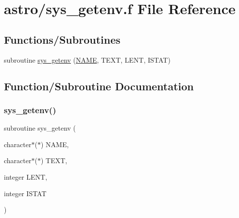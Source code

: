 \hypertarget{astro_2sys__getenv_8f}{}\section{astro/sys\+\_\+getenv.f File Reference}
\label{astro_2sys__getenv_8f}
\subsection*{Functions/\+Subroutines}
\begin{DoxyCompactItemize}
\item 
subroutine \hyperlink{astro_2sys__getenv_8f_aca2c6679545619d1cedc82daed32a87a}{sys\+\_\+getenv} (\hyperlink{inflate_8h_a164ea0159d5f0b5f12a646f25f99eceaa67bc2ced260a8e43805d2480a785d312}{N\+A\+ME}, T\+E\+XT, L\+E\+NT, I\+S\+T\+AT)
\end{DoxyCompactItemize}


\subsection{Function/\+Subroutine Documentation}
\mbox{\label{astro_2sys__getenv_8f_aca2c6679545619d1cedc82daed32a87a}} 
\subsubsection{\texorpdfstring{sys\+\_\+getenv()}{sys\_getenv()}}
{\footnotesize\ttfamily subroutine sys\+\_\+getenv (\begin{DoxyParamCaption}\item[{character$\ast$($\ast$)}]{N\+A\+ME,  }\item[{character$\ast$($\ast$)}]{T\+E\+XT,  }\item[{integer}]{L\+E\+NT,  }\item[{integer}]{I\+S\+T\+AT }\end{DoxyParamCaption})}

